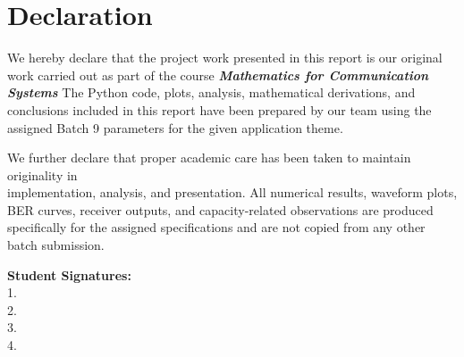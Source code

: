 \chapter*{Declaration}

We hereby declare that the project work presented in this report is our original work carried out as part of the course 
\textbf{\textit{Mathematics for Communication Systems}}
The Python code, plots, analysis, mathematical derivations, and conclusions included in this report have been prepared by our team using the assigned Batch 9 parameters for the given application theme.

We further declare that proper academic care has been taken to maintain originality in ~\\
implementation, analysis, and presentation. All numerical results, waveform plots, BER curves, receiver outputs, and capacity-related observations are produced specifically for the assigned specifications and are not copied from any other batch submission.

\vspace{1.8cm}

\begin{flushleft}
\textbf{Student Signatures:}\\[0.8cm]
1.\underline{\hspace{6cm}}\\
2.\underline{\hspace{6cm}}\\
3.\underline{\hspace{6cm}}\\
4.\underline{\hspace{6cm}}\\
\end{flushleft}

\clearpage